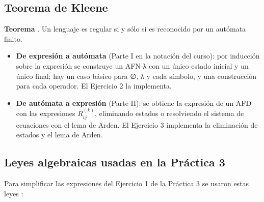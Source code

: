 \hypertarget{teorema-de-kleene}{%
\subsection{Teorema de Kleene}\label{teorema-de-kleene}}

\textbf{Teorema} \autocites{kleene1956}[sec.~3.2, teoremas 3.4 y 3.7]{hopcroft2007}[sec.~1.3, teorema 1.54]{sipser2013}. Un lenguaje es regular si y sólo si es reconocido por un autómata finito.

\begin{itemize}
\tightlist
\item
  \textbf{De expresión a autómata} (Parte I en la notación del curso): por inducción sobre la expresión se construye un AFN-λ con un único estado inicial y un único final; hay un caso básico para ∅, λ y cada símbolo, y una construcción para cada operador. El Ejercicio 2 la implementa.
\item
  \textbf{De autómata a expresión} (Parte II): se obtiene la expresión de un AFD con las expresiones \(R_{ij}^{(k)}\), eliminando estados o resolviendo el sistema de ecuaciones con el lema de Arden. El Ejercicio 3 implementa la eliminación de estados y el lema de Arden.
\end{itemize}

\hypertarget{leyes-algebraicas-usadas-en-la-pruxe1ctica-3}{%
\subsection{Leyes algebraicas usadas en la Práctica 3}\label{leyes-algebraicas-usadas-en-la-pruxe1ctica-3}}

Para simplificar las expresiones del Ejercicio 1 de la Práctica 3 se usaron estas leyes \autocite[sec.~3.4]{hopcroft2007}:

